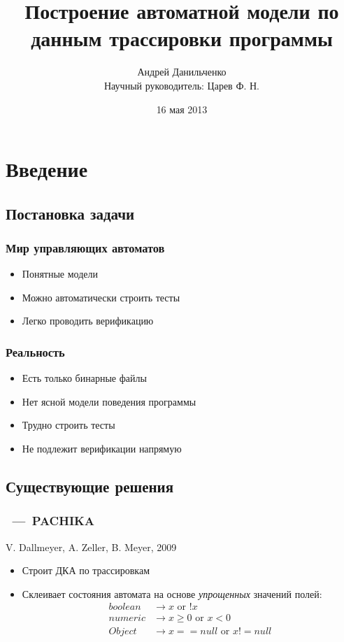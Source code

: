 \documentclass{beamer}
\title{Построение автоматной модели по данным трассировки программы}
\author[]{Андрей Данильченко \\
Научный руководитель: Царев Ф. Н.} %
\institute[НИУ ИТМО]{СПб НИУ ИТМО}
\date{16 мая 2013}
\begin{document}
\begin{frame}
\titlepage
\end{frame}


\section{Введение} 
\subsection{Постановка задачи}


\begin{frame}
\frametitle{Мир управляющих автоматов}
\begin{itemize}
\item Понятные модели
\item Можно автоматически строить тесты
\item Легко проводить верификацию
\end{itemize}
\end{frame}


\begin{frame}
\frametitle{Реальность}
\begin{itemize}
\item Есть только бинарные файлы
\item Нет ясной модели поведения программы
\item Трудно строить тесты
\item Не подлежит верификации напрямую
\end{itemize}
\end{frame}


\subsection{Существующие решения}

\begin{frame}
\frametitle{\subsecname~---~PACHIKA}
V. Dallmeyer, A. Zeller, B. Meyer, 2009 

\begin{itemize}
\item Строит ДКА по трассировкам
\item Склеивает состояния автомата на основе \textit{упрощенных} значений полей:
\begin{align*}
boolean & \rightarrow x \mbox{ or } !x\\
numeric &\rightarrow x \ge 0 \mbox{ or }  x < 0\\
Object &\rightarrow x == null \mbox{ or } x != null
\end{align*}
\end{itemize}
\end{frame}
\end{document}
